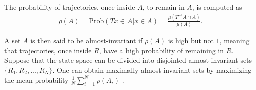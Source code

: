 The probability of trajectories, once inside $A$, to remain in $A$, is computed as 
\begin{align}
    \rho(A) = \mathrm{Prob}(Tx \in A | x \in A) = \frac{\mu( T^{-1} A \cap A)}{\mu(A)}.
\end{align}

A set $A$ is then said to be almost-invariant if $\rho(A)$ is high but not $1$, meaning that trajectories, once inside $R$, have a high probability of remaining in $R$. Suppose that the state space can be divided into disjointed almost-invariant sets $\{R_1, R_2, ..., R_N\}$. One can obtain maximally almost-invariant sets by maximizing the mean probability $\frac{1}{N}\sum_{i=1}^{N} \rho(A_i)$ \cite{froyland2005statistically, froyland2003detecting}.




